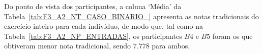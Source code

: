 Do ponto de vista dos participantes, a coluna `Média' da Tabela~\ref{tab:F3_A2_NT_CASO_BINARIO_} apresenta as notas tradicionais do exercício inteiro para cada indivíduo, de modo que, tal como na Tabela~\ref{tab:F3_A2_NP_ENTRADAS}, os participantes $B4$ e $B5$ foram os que obtiveram menor nota tradicional, sendo $7.778$ para ambos.

